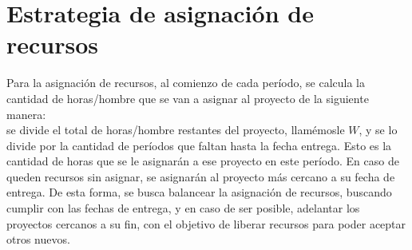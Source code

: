\section{Estrategia de asignación de recursos}

Para la asignación de recursos, al comienzo de cada período, se calcula la cantidad de horas/hombre que se van a asignar al proyecto de la siguiente manera: \\
se divide el total de horas/hombre restantes del proyecto, llamémosle $W$, y se lo divide por la 
cantidad de períodos que faltan hasta la fecha entrega. Esto es la cantidad de horas que se le asignarán a ese proyecto en este período.
En caso de queden recursos sin asignar, se asignarán al proyecto más cercano a su fecha de entrega. 
De esta forma, se busca balancear la asignación de recursos, buscando cumplir con las fechas de entrega, y en caso de ser posible, adelantar los proyectos 
cercanos a su fin, con el objetivo de liberar recursos para poder aceptar otros nuevos.
